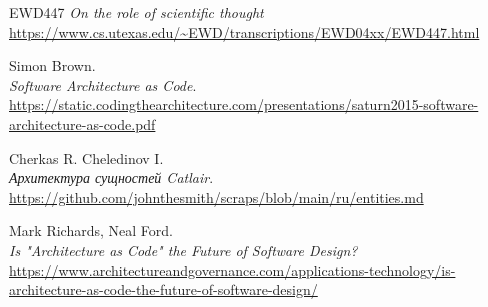 \documentclass[final]{article}
\begin{document}
    \renewcommand{\refname}{Список литературы}
    \begin{thebibliography}{9}

         EWD447
        \textit{On the role of scientific thought}
        \url{https://www.cs.utexas.edu/~EWD/transcriptions/EWD04xx/EWD447.html}

        Simon Brown.\\
        \textit{Software Architecture as Code}.\\
        \url{https://static.codingthearchitecture.com/presentations/saturn2015-software-architecture-as-code.pdf}

        Cherkas R. Cheledinov I.\\
        \textit{Архитектура сущностей Catlair}.\\
        \url{https://github.com/johnthesmith/scraps/blob/main/ru/entities.md}

        Mark Richards, Neal Ford.\\
        \textit{Is "Architecture as Code" the Future of Software Design?}\\
        \url{https://www.architectureandgovernance.com/applications-technology/is-architecture-as-code-the-future-of-software-design/}

    \end{thebibliography}
\end{document}
